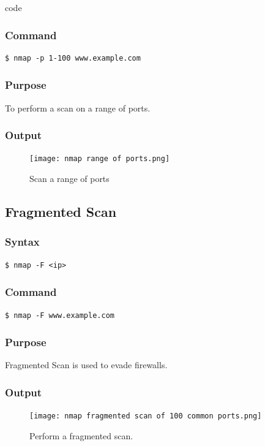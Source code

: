 code \documentclass[11pt]{article}
\begin{document}
\subsubsection*{Command}
\begin{verbatim}
$ nmap -p 1-100 www.example.com
\end{verbatim}

\subsubsection*{Purpose}
To perform a scan on a range of ports.

\subsubsection*{Output}
\begin{figure}[H]
    \centering
    \texttt{[image: nmap range of ports.png]}
    \caption{Scan a range of ports}
    \label{fig:1}
\end{figure}

\subsection{Fragmented Scan}

\subsubsection{Syntax}
\begin{verbatim}
$ nmap -F <ip>
\end{verbatim}

\subsubsection*{Command}
\begin{verbatim}
$ nmap -F www.example.com
\end{verbatim}

\subsubsection*{Purpose}
Fragmented Scan is used to evade firewalls.

\subsubsection*{Output}
\begin{figure}[H]
    \centering
    \texttt{[image: nmap fragmented scan of 100 common ports.png]}
    \caption{Perform a fragmented scan. }
    \label{fig:1}
\end{figure}
\end{document}
